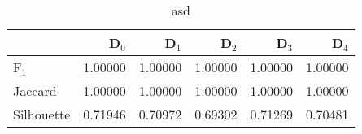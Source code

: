 \begin{table}
\centering
\caption{asd}
\label{tab:s1-cont-splitmerge-single}
\begin{tabular}{lrrrrr}
\toprule
{} &   D$_0$ &   D$_1$ &   D$_2$ &   D$_3$ &   D$_4$ \\
\midrule
F$_1$      & 1.00000 & 1.00000 & 1.00000 & 1.00000 & 1.00000 \\
Jaccard    & 1.00000 & 1.00000 & 1.00000 & 1.00000 & 1.00000 \\
Silhouette & 0.71946 & 0.70972 & 0.69302 & 0.71269 & 0.70481 \\
\bottomrule
\end{tabular}
\end{table}
